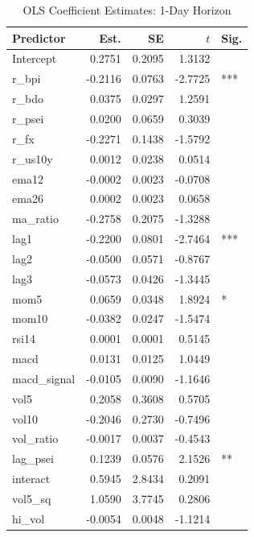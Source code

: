 \begin{table}
\centering
\caption{OLS Coefficient Estimates: 1-Day Horizon}
\label{tab:ols_coef_1d}
\footnotesize
\setlength{\tabcolsep}{6pt}
\begin{tabular*}{\linewidth}{@{\extracolsep{\fill}} l r r r l}
\toprule
Predictor & Est. & SE & $t$ & Sig. \\
\midrule
Intercept & 0.2751 & 0.2095 & 1.3132 &  \\
r\_bpi & -0.2116 & 0.0763 & -2.7725 & *** \\
r\_bdo & 0.0375 & 0.0297 & 1.2591 &  \\
r\_psei & 0.0200 & 0.0659 & 0.3039 &  \\
r\_fx & -0.2271 & 0.1438 & -1.5792 &  \\
r\_us10y & 0.0012 & 0.0238 & 0.0514 &  \\
ema12 & -0.0002 & 0.0023 & -0.0708 &  \\
ema26 & 0.0002 & 0.0023 & 0.0658 &  \\
ma\_ratio & -0.2758 & 0.2075 & -1.3288 &  \\
lag1 & -0.2200 & 0.0801 & -2.7464 & *** \\
lag2 & -0.0500 & 0.0571 & -0.8767 &  \\
lag3 & -0.0573 & 0.0426 & -1.3445 &  \\
mom5 & 0.0659 & 0.0348 & 1.8924 & * \\
mom10 & -0.0382 & 0.0247 & -1.5474 &  \\
rsi14 & 0.0001 & 0.0001 & 0.5145 &  \\
macd & 0.0131 & 0.0125 & 1.0449 &  \\
macd\_signal & -0.0105 & 0.0090 & -1.1646 &  \\
vol5 & 0.2058 & 0.3608 & 0.5705 &  \\
vol10 & -0.2046 & 0.2730 & -0.7496 &  \\
vol\_ratio & -0.0017 & 0.0037 & -0.4543 &  \\
lag\_psei & 0.1239 & 0.0576 & 2.1526 & ** \\
interact & 0.5945 & 2.8434 & 0.2091 &  \\
vol5\_sq & 1.0590 & 3.7745 & 0.2806 &  \\
hi\_vol & -0.0054 & 0.0048 & -1.1214 &  \\
\bottomrule
\end{tabular*}
\\
\end{table}
